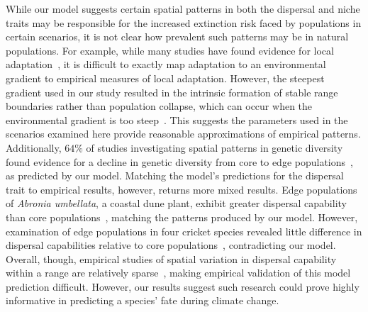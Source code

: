 \documentclass[11pt]{article}
\begin{document}
While our model suggests certain spatial patterns in both the dispersal and niche traits may be responsible for the increased extinction risk faced by populations in certain scenarios, it is not clear how prevalent such patterns may be in natural populations. For example, while many studies have found evidence for local adaptation~\citep{hereford2009quantitative}, it is difficult to exactly map adaptation to an environmental gradient to empirical measures of local adaptation. However, the steepest gradient used in our study resulted in the intrinsic formation of stable range boundaries rather than population collapse, which can occur when the environmental gradient is too steep~\citep{kirkpatrick1997evolution, alleaume2006geographical, polechova2015limits, polechova2018sky}. This suggests the parameters used in the scenarios examined here provide reasonable approximations of empirical patterns. Additionally, $64\%$ of studies investigating spatial patterns in genetic diversity found evidence for a decline in genetic diversity from core to edge populations~\citep{eckert2008genetic}, as predicted by our model. Matching the model's predictions for the dispersal trait to empirical results, however, returns more mixed results. Edge populations of \textit{Abronia umbellata}, a coastal dune plant, exhibit greater dispersal capability than core populations~\citep{darling2008increased}, matching the patterns produced by our model. However, examination of edge populations in four cricket species revealed little difference in dispersal capabilities relative to core populations~\citep{simmons2004changes}, contradicting our model. Overall, though, empirical studies of spatial variation in dispersal capability within a range are relatively sparse~\citep{hargreaves2014evolution}, making empirical validation of this model prediction difficult. However, our results suggest such research could prove highly informative in predicting a species' fate during climate change.
\end{document}
